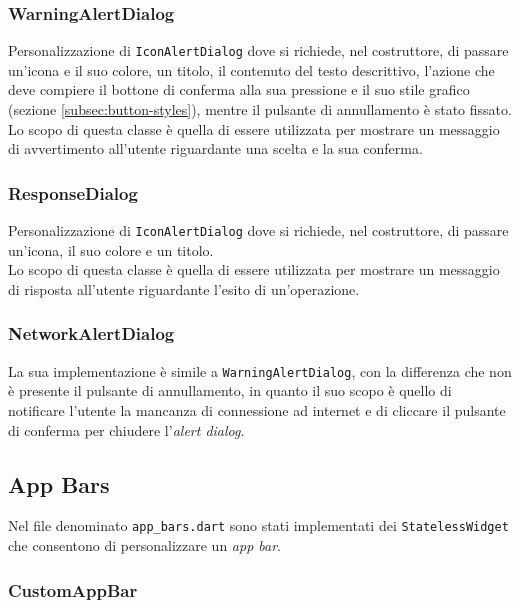 \subsubsection*{WarningAlertDialog}
\label{subsubsec:warning-alert-dialog}

Personalizzazione di \lstinline{IconAlertDialog} dove si richiede, nel costruttore, di passare un'icona e il suo colore, un titolo, il contenuto del testo descrittivo, l'azione che deve compiere il bottone di conferma alla sua pressione e il suo stile grafico (sezione \ref{subsec:button-styles}), mentre il pulsante di annullamento è stato fissato.\\
Lo scopo di questa classe è quella di essere utilizzata per mostrare un messaggio di avvertimento all'utente riguardante una scelta e la sua conferma.
\subsubsection*{ResponseDialog}
\label{subsubsec:response-dialog}

Personalizzazione di \lstinline{IconAlertDialog} dove si richiede, nel costruttore, di passare un'icona, il suo colore e un titolo.\\
Lo scopo di questa classe è quella di essere utilizzata per mostrare un messaggio di risposta all'utente riguardante l'esito di un'operazione.\\

\subsubsection*{NetworkAlertDialog}
\label{subsubsec:network-alert-dialog}

La sua implementazione è simile a \lstinline{WarningAlertDialog}, con la differenza che non è presente il pulsante di annullamento, in quanto il suo scopo è quello di notificare l'utente la mancanza di connessione ad internet e di cliccare il pulsante di conferma per chiudere l'\emph{alert dialog}.

\subsection{App Bars}
\label{subsec:app-bars}

Nel file denominato \lstinline{app_bars.dart} sono stati implementati dei \lstinline{StatelessWidget} che consentono di personalizzare un \emph{app bar}.

\subsubsection*{CustomAppBar}
\label{subsubsec:custom-app-bar}

